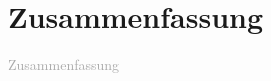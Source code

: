 \thispagestyle{empty}
\chapter*{Zusammenfassung}
\label{sec:Zusammenfassung}
\textcolor{darkgray}{
  Zusammenfassung
}

